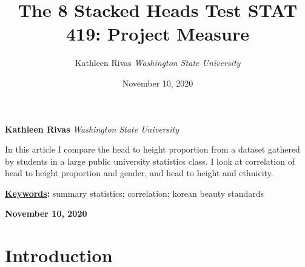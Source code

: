 \documentclass[]{article}
\title{\textbf{\textcolor{WSU.crimson}{The 8 Stacked Heads Test}} \newline \textbf{\textcolor{WSU.gray}{STAT 419: Project Measure}}  }
\author{\Large Kathleen Rivas\vspace{0.05in} \newline\normalsize\emph{Washington State University}  }
\date{November 10, 2020}
\newcommand*{\authorfont}{\fontfamily{phv}\selectfont}
\renewenvironment{abstract}
{{%
  \setlength{\leftmargin}{0mm}
  \setlength{\rightmargin}{\leftmargin}%
}%
  \relax}
{\endlist}
\begin{document}
	
%

{%
\setlength{\parindent}{0pt}
\thispagestyle{plain}
{\fontsize{18}{20}\selectfont\raggedright 
\maketitle  %

}

{
   \vskip 13.5pt\relax \normalsize\fontsize{11}{12} 
   
\textbf{\authorfont Kathleen Rivas} \hskip 15pt \emph{\small Washington State University}   

}

}








\begin{abstract}

    \hbox{\vrule height .2pt width 39.14pc}

    \vskip 8.5pt %

\noindent In this article I compare the head to height proportion from a dataset
gathered by students in a large public university statistics class. I
look at correlation of head to height proportion and gender, and head to
height and ethnicity.


\vskip 8.5pt \noindent \textbf{\underline{Keywords}:} summary statistics; correlation; korean beauty standards \par

    




    
    \hbox{\vrule height .2pt width 39.14pc}
    \vskip 5pt 
    \hfill \textbf{\textcolor{WSU.gray}{ November 10, 2020 } }
    \vskip 5pt 
    
\end{abstract}


\vskip -8.5pt




\noindent  

\section{Introduction}
\label{sec:intro}
\end{document}
